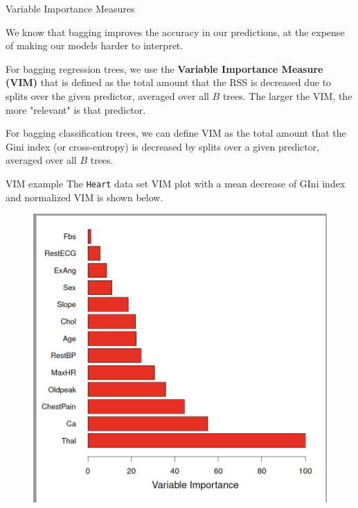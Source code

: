 \documentclass{beamer}
\begin{document}
	
	\begin{frame}{Variable Importance Measures}
		
		We know that bagging improves the accuracy in our predictions, at the expense of making our models harder to interpret. 
		
		For bagging regression trees, we use the {\bf Variable Importance Measure (VIM)} that is defined as the total amount that the RSS is decreased due to splits over the given predictor, averaged over all $B$ trees.  The larger the VIM, the more "relevant" is that predictor.
		
		For bagging classification trees, we can define VIM as the total amount that the Gini index (or cross-entropy) is decreased by splits over a given predictor, averaged over all $B$ trees. 
	\end{frame}
	
	\begin{frame}{VIM example}
		The {\tt Heart} data set VIM plot with a mean decrease of GIni index and normalized VIM is shown below.
		\begin{figure}[h]
			\centering
			\includegraphics[scale=0.35]{../../Figures/fig_vim.png}
		\end{figure}
		
	\end{frame}
	
\end{document}
